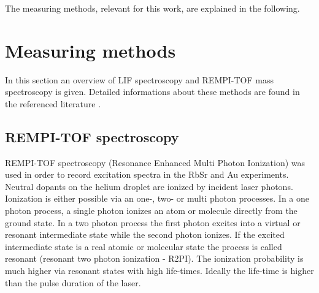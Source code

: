 \documentclass[parskip,12pt,headsepline,a4paper] {scrbook}
\begin{document}
The measuring methods, relevant for this work, are explained in the following.

\section{Measuring methods}
\label{chap:methods}
\vspace{-1\baselineskip}
In this section an overview of LIF spectroscopy and REMPI-TOF mass spectroscopy is given. Detailed informations about these methods are found in the referenced literature \cite{demtr-laser} \cite{lackner} \cite{lackner-doc}.


\subsection{REMPI-TOF spectroscopy}
\vspace{-1\baselineskip}
REMPI-TOF spectroscopy (Resonance Enhanced Multi Photon Ionization) was used in order to record excitation spectra in the RbSr and Au experiments. Neutral dopants on the helium droplet are ionized by incident laser photons. Ionization is either possible via an one-, two- or multi photon processes. In a one photon process, a single photon ionizes an atom or molecule directly from the ground state. In a two photon process the first photon excites into a virtual or resonant intermediate state while the second photon ionizes. If the excited intermediate state is a real atomic or molecular state the process is called resonant (resonant two photon ionization - R2PI). The ionization probability is much higher via resonant states with high life-times. Ideally the life-time is higher than the pulse duration of the laser. %
\end{document}
